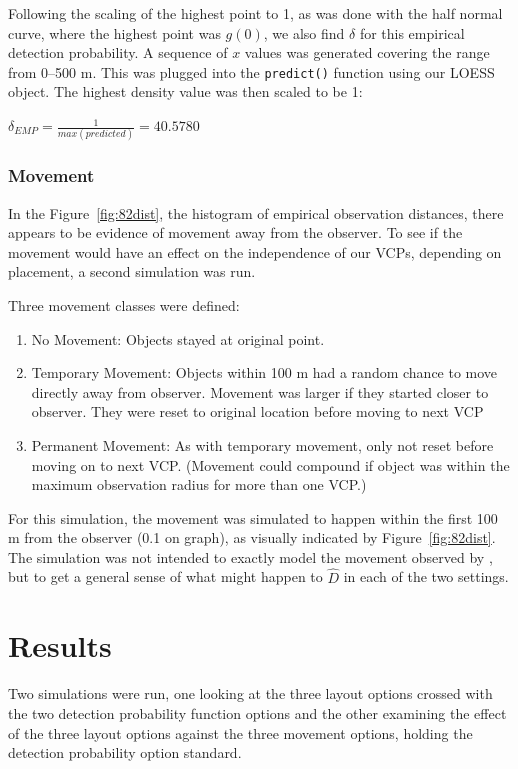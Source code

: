 \documentclass[12pt]{article}
\begin{document}
Following the scaling of the highest point to 1, as was done with the half normal curve, where the highest point was $g(0)$, we also find $\delta$ for this empirical detection probability. A sequence of $x$ values was generated covering the range from 0--500 m. This was plugged into the \texttt{predict()} function using our LOESS object. The highest density value was then scaled to be 1:

$\delta_{EMP}=\frac{1}{max(predicted)}=40.5780$ 

\subsubsection{Movement}
In the Figure~\ref{fig:82dist}, the histogram of empirical observation distances, there appears to be evidence of movement away from the observer. To see if the movement would have an effect on the independence of our VCPs, depending on placement, a second simulation was run.

Three movement classes were defined:
\begin{enumerate}
\item No Movement: Objects stayed at original point.
\item Temporary Movement: Objects within 100 m had a random chance to move directly away from observer. Movement was larger if they started closer to observer. They were reset to original location before moving to next VCP
\item Permanent Movement: As with temporary movement, only not reset before moving on to next VCP. (Movement could compound if object was within the maximum observation radius for more than one VCP.)
\end{enumerate}

For this simulation, the movement was simulated to happen within the first 100 m from the observer (0.1 on graph), as visually indicated by Figure~\ref{fig:82dist}. The simulation was not intended to exactly model the movement observed by \textcite{micronesian}, but to get a general sense of what might happen to $\hat{D}$ in each of the two settings.

\section{Results}
Two simulations were run, one looking at the three layout options crossed with the two detection probability function options and the other examining the effect of the three layout options against the three movement options, holding the detection probability option standard.
\end{document}
